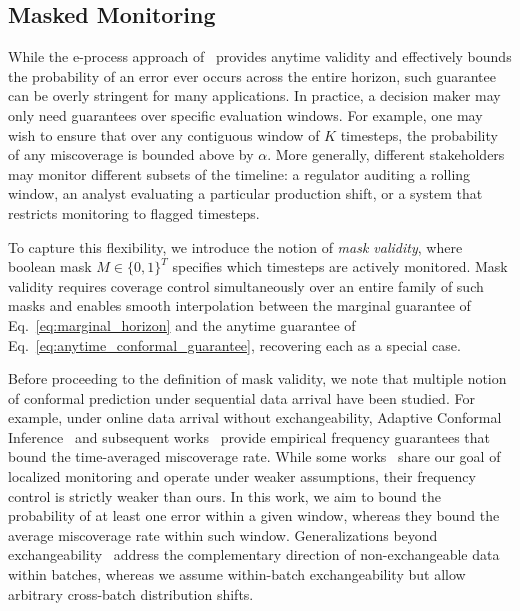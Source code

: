 \documentclass{uai2026} %
\newcommand{\1}{\mathbf{1}}
\begin{document}
\subsection{Masked Monitoring}

While the e-process approach of~\citet{gauthier2025values} provides anytime validity and effectively bounds the probability of an error ever occurs across the entire horizon, such guarantee can be overly stringent for many applications. In practice, a decision maker may only need guarantees over specific evaluation windows. For example, one may wish to ensure that over any contiguous window of $K$ timesteps, the probability of any miscoverage is bounded above by $\alpha$. More generally, different stakeholders may monitor different subsets of the timeline: a regulator auditing a rolling window, an analyst evaluating a particular production shift, or a system that restricts monitoring to flagged timesteps.

To capture this flexibility, we introduce the notion of \emph{mask validity}, where boolean mask $M \in \{0,1\}^T$ specifies which timesteps are actively monitored.  Mask validity requires coverage control simultaneously over an entire family of such masks and enables smooth interpolation between the marginal guarantee of Eq.~\eqref{eq:marginal_horizon} and the anytime guarantee of Eq.~\eqref{eq:anytime_conformal_guarantee}, recovering each as a special case.

Before proceeding to the definition of mask validity, we note that multiple notion of conformal prediction under sequential data arrival have been studied. For example, under online data arrival without exchangeability, Adaptive Conformal Inference~\citep{gibbs2021adaptive} and subsequent works~\citep{bhatnagar2023improved,gibbs2024conformal, angelopoulos2023conformal} provide empirical frequency guarantees that bound the time-averaged miscoverage rate. While  some works~\citep{bhatnagar2023improved} share our goal of localized monitoring and operate under weaker assumptions, their frequency control is strictly weaker than ours. In this work, we aim to bound the probability of at least one error within a given window, whereas they bound the average miscoverage rate within such window. Generalizations beyond exchangeability~\citep{barber2023conformal} address the complementary direction of non-exchangeable data within batches, whereas we assume within-batch exchangeability but allow arbitrary cross-batch distribution shifts.
\end{document}
